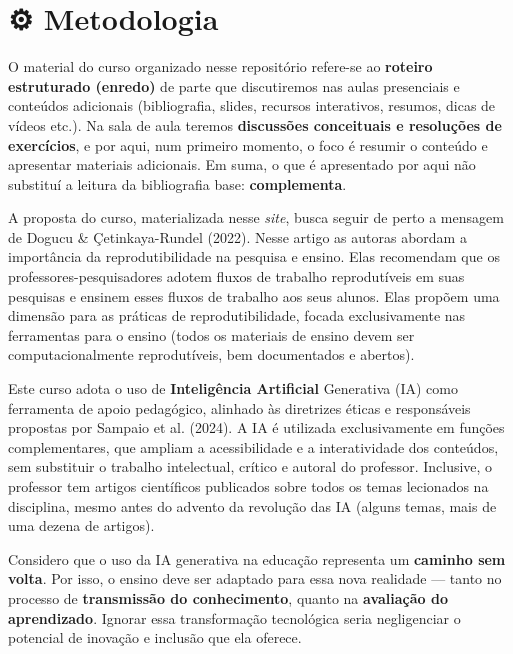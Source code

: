\documentclass[
  a4paper,
]{book}
\newcommand{\emojitext}[1]{{\emoji #1}}
\begin{document}
\section*{\texorpdfstring{\emojitext{⚙️}
Metodologia}{ Metodologia}}\label{sec-method}
\addcontentsline{toc}{section}{\emojitext{⚙️} Metodologia}

\markright{\emojitext{⚙️} Metodologia}

O material do curso organizado nesse repositório refere-se ao
\textbf{roteiro estruturado (enredo)} de parte que discutiremos nas
aulas presenciais e conteúdos adicionais (bibliografia, slides, recursos
interativos, resumos, dicas de vídeos etc.). Na sala de aula teremos
\textbf{discussões conceituais e resoluções de exercícios}, e por aqui,
num primeiro momento, o foco é resumir o conteúdo e apresentar materiais
adicionais. Em suma, o que é apresentado por aqui não substituí a
leitura da bibliografia base: \textbf{complementa}.

A proposta do curso, materializada nesse \emph{site}, busca seguir de
perto a mensagem de Dogucu \& Çetinkaya-Rundel (2022). Nesse artigo as
autoras abordam a importância da reprodutibilidade na pesquisa e ensino.
Elas recomendam que os professores-pesquisadores adotem fluxos de
trabalho reprodutíveis em suas pesquisas e ensinem esses fluxos de
trabalho aos seus alunos. Elas propõem uma dimensão para as práticas de
reprodutibilidade, focada exclusivamente nas ferramentas para o ensino
(todos os materiais de ensino devem ser computacionalmente
reprodutíveis, bem documentados e abertos).

Este curso adota o uso de \textbf{Inteligência Artificial} Generativa
(IA) como ferramenta de apoio pedagógico, alinhado às diretrizes éticas
e responsáveis propostas por Sampaio et al. (2024). A IA é utilizada
exclusivamente em funções complementares, que ampliam a acessibilidade e
a interatividade dos conteúdos, sem substituir o trabalho intelectual,
crítico e autoral do professor. Inclusive, o professor tem artigos
científicos publicados sobre todos os temas lecionados na disciplina,
mesmo antes do advento da revolução das IA (alguns temas, mais de uma
dezena de artigos).

Considero que o uso da IA generativa na educação representa um
\textbf{caminho sem volta}. Por isso, o ensino deve ser adaptado para
essa nova realidade --- tanto no processo de \textbf{transmissão do
conhecimento}, quanto na \textbf{avaliação do aprendizado}. Ignorar essa
transformação tecnológica seria negligenciar o potencial de inovação e
inclusão que ela oferece.
\end{document}
